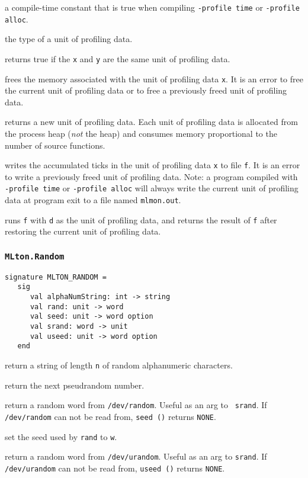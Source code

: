 \begin{description}

a compile-time constant that is true when compiling {\tt -profile
time} or {\tt -profile alloc}.

 the type of a unit of profiling data.

returns true if the {\tt x} and {\tt y} are the same unit of profiling
data.

frees the memory associated with the unit of profiling data {\tt x}.
It is an error to free the current unit of profiling data or to free a
previously freed unit of profiling data.

returns a new unit of profiling data.  Each unit of profiling data is
allocated from the process heap (\emph{not} the {\mlton} heap) and
consumes memory proportional to the number of source functions.

writes the accumulated ticks in the unit of profiling data {\tt x} to
file {\tt f}.  It is an error to write a previously freed unit of
profiling data.  Note: a program compiled with {\tt -profile time} or
{\tt -profile alloc} will always write the current unit of profiling
data at program exit to a file named {\tt mlmon.out}.

runs {\tt f} with {\tt d} as the unit of profiling data, and returns
the result of {\tt f} after restoring the current unit of profiling
data.

\end{description}

\subsubsection{\tt MLton.Random}
\begin{verbatim}
signature MLTON_RANDOM =
   sig
      val alphaNumString: int -> string
      val rand: unit -> word
      val seed: unit -> word option
      val srand: word -> unit
      val useed: unit -> word option
   end
\end{verbatim}

\begin{description}
return a string of length {\tt n} of random alphanumeric characters.

return the next pseudrandom number.

return a random word from {\tt /dev/random}.  Useful as an arg to {\tt
srand}.  If {\tt /dev/random} can not be read from, {\tt seed ()}
returns {\tt NONE}.

set the seed used by {\tt rand} to {\tt w}.

return a random word from {\tt /dev/urandom}.  Useful as an arg to
{\tt srand}.  If {\tt /dev/urandom} can not be read from, {\tt useed
()} returns {\tt NONE}.

\end{description}

